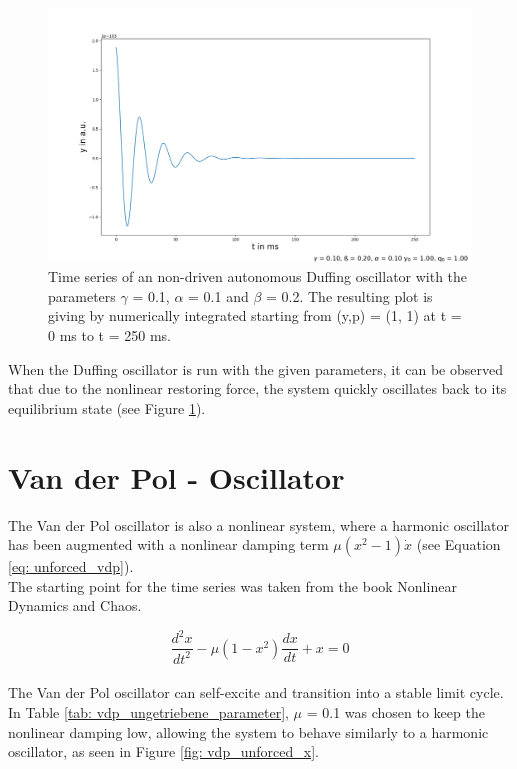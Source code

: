 \documentclass[oneside,10pt,a4paper]{report}
\begin{document}
		
		\begin{figure}[H]
			\centering
			\includegraphics[scale=0.4]{duffing_unforced_y.png}
			\caption{Time series of an non-driven autonomous Duffing oscillator with the parameters $\gamma$ = 0.1, $\alpha$ = 0.1 and $\beta$ = 0.2. The resulting plot is giving by numerically integrated starting from (y,p) = (1, 1) at t = 0 ms to t = 250 ms.}
			\label{fig: duffing_unforced_y}
		\end{figure}
		
		When the Duffing oscillator is run with the given parameters, it can be observed that due to the nonlinear restoring force, the system quickly oscillates back to its equilibrium state (see Figure \ref{fig: duffing_unforced_y}).
	
	
		\section{Van der Pol - Oscillator}
		The Van der Pol oscillator is also a nonlinear system, where a harmonic oscillator has been augmented with a nonlinear damping term $\mu(x^2 - 1)\dot{x}$ (see Equation \ref{eq: unforced_vdp}).\\
		The starting point for the time series was taken from the book Nonlinear Dynamics and Chaos\cite{Nonlinear_Dynamic_and_chaos_book}.
		
		\begin{equation}\label{eq: unforced_vdp}
			\frac{d^2x}{dt^2} - \mu (1 - x^2) \frac{dx}{dt} + x = 0
		\end{equation}
		\\
		The Van der Pol oscillator can self-excite and transition into a stable limit cycle. In Table \ref{tab: vdp_ungetriebene_parameter}, $\mu$ = 0.1 was chosen to keep the nonlinear damping low, allowing the system to behave similarly to a harmonic oscillator, as seen in Figure \ref{fig: vdp_unforced_x}.
		
\end{document}
